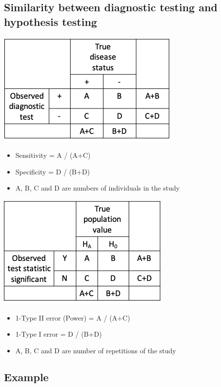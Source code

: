 \documentclass[
]{book}
\providecommand{\tightlist}{%
  \setlength{\itemsep}{0pt}\setlength{\parskip}{0pt}}
\begin{document}
\hypertarget{similarity-between-diagnostic-testing-and-hypothesis-testing-1}{%
\subsection{Similarity between diagnostic testing and hypothesis testing}\label{similarity-between-diagnostic-testing-and-hypothesis-testing-1}}

\includegraphics[width=0.5\linewidth]{./5_4a}

\begin{itemize}
\tightlist
\item
  Sensitivity = A / (A+C)
\item
  Specificity = D / (B+D)
\item
  A, B, C and D are numbers of individuals in the study
\end{itemize}

\includegraphics[width=0.5\linewidth]{./5_4b}

\begin{itemize}
\tightlist
\item
  1-Type II error (Power) = A / (A+C)
\item
  1-Type I error = D / (B+D)
\item
  A, B, C and D are number of repetitions of the study
\end{itemize}

\hypertarget{example-3}{%
\subsection{Example}\label{example-3}}
\end{document}

